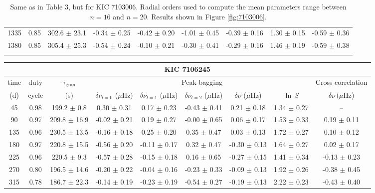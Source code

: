 \documentclass[twocolumn]{aastex61}%
\begin{document}
\begin{table*}[ht]
\begin{tabular}{ccc|ccccc|c}
1335 & 0.85 & 302.6 $\pm$ 23.1 & -0.34 $\pm$ 0.25 & -0.42 $\pm$ 0.20 & -1.01 $\pm$ 0.45 & -0.39 $\pm$ 0.16 & 1.30 $\pm$ 0.15 & -0.59 $\pm$ 0.36\\
1380 & 0.85 & 305.4 $\pm$ 25.3 & -0.54 $\pm$ 0.24 & -0.10 $\pm$ 0.21 & -0.30 $\pm$ 0.41 & -0.29 $\pm$ 0.16 & 1.46 $\pm$ 0.19 & -0.59 $\pm$ 0.38\\\vspace{-0.3cm}
\end{tabular}
\caption{Same as in Table 3, but for KIC 7103006. Radial orders used to compute the mean parameters range between $n=16$ and $n=20$. Results shown in Figure \ref{fig:7103006}.}\label{tab:7103006}\vspace{-2cm}
\end{table*}

\begin{table*}[ht]\centering\fontsize{9.}{7.}\selectfont
\begin{tabular}{ccc|ccccc|c}
\multicolumn{9}{c}{KIC 7106245}\\ \hline\hline
time & duty & $\tau_\text{gran}$ &\multicolumn{5}{c|}{Peak-bagging}&Cross-correlation\\
(d)& cycle & (s)&$\delta\nu_{l=0}$ ($\mu$Hz) & $\delta\nu_{l=1}$ ($\mu$Hz) & $\delta\nu_{l=2}$ ($\mu$Hz) & $\delta\nu$ ($\mu$Hz)& $\ln\,S$ & $\delta\nu\,(\mu$Hz)\\\hline
45 & 0.98 & 199.2 $\pm$ 0.8 & 0.30 $\pm$ 0.31 & 0.17 $\pm$ 0.23 & -0.43 $\pm$ 0.41 & 0.21 $\pm$ 0.18 & 1.34 $\pm$ 0.27 & --\\
90 & 0.97 & 209.8 $\pm$ 16.9 & -0.02 $\pm$ 0.21 & 0.19 $\pm$ 0.27 & -0.00 $\pm$ 0.65 & 0.06 $\pm$ 0.17 & 1.53 $\pm$ 0.33 & 0.19 $\pm$ 0.11\\
135 & 0.96 & 230.5 $\pm$ 13.5 & -0.16 $\pm$ 0.18 & 0.25 $\pm$ 0.20 & 0.35 $\pm$ 0.47 & 0.03 $\pm$ 0.13 & 1.72 $\pm$ 0.27 & 0.10 $\pm$ 0.12\\
180 & 0.97 & 220.8 $\pm$ 15.5 & -0.56 $\pm$ 0.20 & -0.11 $\pm$ 0.17 & 0.32 $\pm$ 0.47 & -0.30 $\pm$ 0.13 & 1.64 $\pm$ 0.27 & 0.02 $\pm$ 0.17\\
225 & 0.96 & 220.5 $\pm$ 9.3 & -0.57 $\pm$ 0.28 & -0.15 $\pm$ 0.18 & 0.16 $\pm$ 0.65 & -0.27 $\pm$ 0.15 & 1.41 $\pm$ 0.34 & -0.13 $\pm$ 0.23\\
270 & 0.80 & 196.5 $\pm$ 14.6 & -0.20 $\pm$ 0.22 & -0.04 $\pm$ 0.16 & -0.23 $\pm$ 0.33 & -0.09 $\pm$ 0.13 & 1.92 $\pm$ 0.26 & -0.38 $\pm$ 0.45\\
315 & 0.78 & 186.7 $\pm$ 22.3 & -0.14 $\pm$ 0.19 & -0.23 $\pm$ 0.19 & -0.54 $\pm$ 0.27 & -0.19 $\pm$ 0.13 & 2.22 $\pm$ 0.23 & -0.43 $\pm$ 0.40\\

\end{tabular}
\end{table*}
\end{document}
